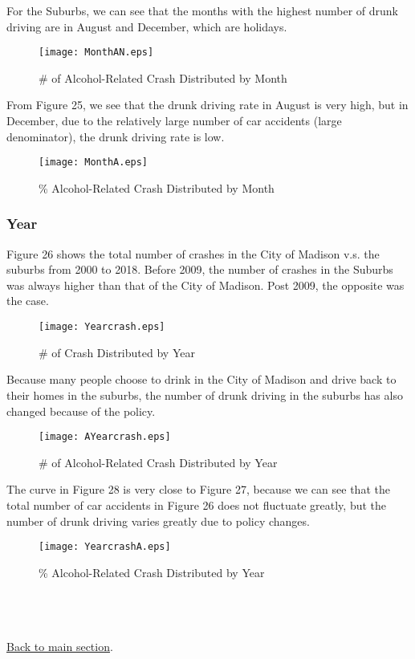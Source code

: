 \documentclass[15pt]{article}
\begin{document}
\newpage
For the Suburbs, we can see that the months with the highest number of drunk driving are in August and December, which are holidays.
\begin{figure}[H]
\flushleft
\texttt{[image: MonthAN.eps]}
\caption{\# of Alcohol-Related Crash Distributed by Month}
\end{figure}

\newpage
From Figure 25, we see that the drunk driving rate in August is very high, but in December, due to the relatively large number of car accidents (large denominator), the drunk driving rate is low.
\begin{figure}[H]
\flushleft
\texttt{[image: MonthA.eps]}
\caption{\% Alcohol-Related Crash Distributed by Month}
\end{figure}

\newpage
\subsubsection{Year}
Figure 26 shows the total number of crashes in the City of Madison v.s. the suburbs from 2000 to 2018. Before 2009, the number of crashes in the Suburbs was always higher than that of the City of Madison. Post 2009, the opposite was the case.
\begin{figure}[H]
\flushleft
\texttt{[image: Yearcrash.eps]}
\caption{\# of Crash Distributed by Year}
\end{figure}

\newpage
Because many people choose to drink in the City of Madison and drive back to their homes in the suburbs, the number of drunk driving in the suburbs has also changed because of the policy. 
\begin{figure}[H]
\flushleft
\texttt{[image: AYearcrash.eps]}
\caption{\# of Alcohol-Related Crash Distributed by Year}
\end{figure}

\newpage
The curve in Figure 28 is very close to Figure 27, because we can see that the total number of car accidents in Figure 26 does not fluctuate greatly, but the number of drunk driving varies greatly due to policy changes.
\begin{figure}[H]
\flushleft
\texttt{[image: YearcrashA.eps]}
\caption{\% Alcohol-Related Crash Distributed by Year}
\end{figure}

~\\
~\\
~\\
\hyperref[sec:When]{\color{blue} \underline {Back to main section}}.
\end{document}
